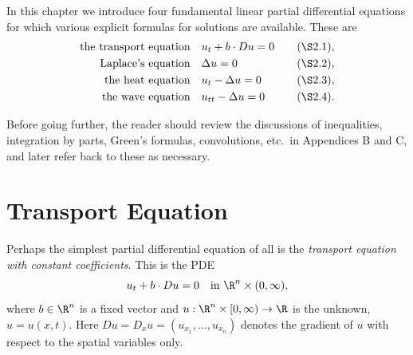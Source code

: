 %


In this chapter we introduce four fundamental linear partial differential equations for which various explicit formulas for solutions are available. These are
$$\begin{align*}
\text{the transport equation} \quad & u_t + b \cdot Du = 0 & \quad (\S 2.1), \\
\text{Laplace's equation} \quad & \Delta u = 0 & \quad (\S 2.2), \\
\text{the heat equation} \quad & u_t - \Delta u = 0 & \quad (\S 2.3), \\
\text{the wave equation} \quad & u_{tt} - \Delta u = 0 & \quad (\S 2.4).
\end{align*}$$

Before going further, the reader should review the discussions of inequalities, integration by parts, Green's formulas, convolutions, etc.\ in Appendices B and C, and later refer back to these as necessary.

\section{Transport Equation}
\label{sec:transport-equation}

Perhaps the simplest partial differential equation of all is the \textit{transport equation with constant coefficients}. This is the PDE
$$u_t + b \cdot Du = 0 \quad \text{in } \R^n \times (0,\infty),$$
where $b \in \R^n$ is a fixed vector and $u : \R^n \times [0,\infty) \to \R$ is the unknown, $u = u(x,t)$. Here $Du = D_xu = (u_{x_1}, \ldots, u_{x_n})$ denotes the gradient of $u$ with respect to the spatial variables only.

